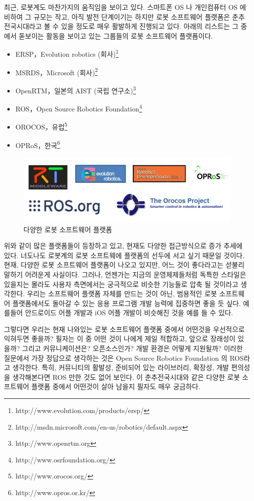 최근, 로봇계도 마찬가지의 움직임을 보이고 있다. 스마트폰 OS 나 개인컴퓨터 OS 에 비하여 그 규모는 작고, 아직 발전 단계이기는 하지만 로봇 소프트웨어 플랫폼은 춘추전국시대라고 볼 수 있을 정도로 매우 활발하게 진행되고 있다.
아래의 리스트는 그 중에서 돋보이는 활동을 보이고 있는 그룹들의 로봇 소프트웨어 플랫폼이다.

\begin{itemize}
\item ERSP，Evolution robotics (회사)\footnote{http://www.evolution.com/products/ersp/}
\item MSRDS，Microsoft (회사)\footnote{http://msdn.microsoft.com/en-us/robotics/default.aspx}
\item OpenRTM，일본의 AIST (국립 연구소)\footnote{http://www.openrtm.org}
\item ROS，Open Source Robotics Foundation\footnote{http://www.osrfoundation.org/}
\item OROCOS，유럽\footnote{http://www.orocos.org/}
\item OPRoS，한국\footnote{http://www.opros.or.kr/}
\end{itemize}

\begin{figure}[h]
\centering\includegraphics[width=\columnwidth]{pictures/chapter1/robotplatforms.png}
\caption{다양한 로봇 소프트웨어 플랫폼}
\end{figure}

위와 같이 많은 플랫폼들이 등장하고 있고, 현재도 다양한 접근방식으로 증가 추세에 있다.
너도나도 로봇계의 로봇 소프트웨에 플랫폼의 선두에 서고 싶기 때문일 것이다.
현재, 다양한 로봇 소프트웨어 플랫폼이 나오고 있지만, 어느 것이 좋다라고는 섣불리 말하기 어려운게 사실이다.
그러나, 언젠가는 지금의 운영체제들처럼 독특한 스타일은 있을지는 몰라도 사용자 측면에서는 궁극적으로 비슷한 기능들로 압축 될 것이라고 생각한다.
우리는 소프트웨어 플랫폼 자체를 만드는 것이 아닌, 범용적인 로봇 소프트웨어 플랫폼에서도 돌아갈 수 있는 응용 프로그램 개발 능력에 집중하면 좋을 듯 싶다.
예를들어 안드로이드 어플 개발과 iOS 어플 개발이 비슷해진 것을 예를 들 수 있다. 

그렇다면 우리는 현재 나와있는 로봇 소프트웨어 플랫폼 중에서 어떤것을 우선적으로 익혀두면 좋을까?
필자는 이 중 어떤 것이 나에게 제일 적합하고, 앞으로 장래성이 있을까?
그리고 커뮤니케이션은?
오픈소스인가?
개발 환경은 어떻게 지원될까?
이러한 질문에서 가장 정답으로 생각하는 것은 Open Source Robotics Foundation 의 ROS라고 생각한다.
특히, 커뮤니티의 활발성, 준비되어 있는 라이브러리, 확장성, 개발 편의성을 생각해본다면 ROS 만한 것도 없어 보인다.
이 춘추전국시대와 같은 다양한 로봇 소프트웨어 플랫폼 중에서 어떤것이 살아 남을지 필자도 매우 궁금하다.

